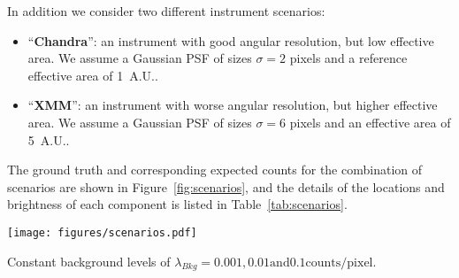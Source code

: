 \documentclass[twocolumn]{aastex631}
\newcommand{\chandra}{\textit{Chandra}~}
\newcommand{\xmm}{\textit{XMM}~}
\newcommand{\todo}[1]{\textcolor{red}{TODO: #1}\PackageWarning{TODO:}{#1!}}
\begin{document}
    In addition we consider two different instrument scenarios:

    \begin{itemize}
        \item {\enquote{\bf Chandra}:} an instrument with good angular resolution, but low effective area. We assume a Gaussian PSF of sizes $\sigma = 2$ pixels and a reference effective area of \qty[mode=text]{1}{A.U.}.
        \item {\enquote{\bf XMM}:} an instrument with worse angular resolution, but higher effective area. We assume a Gaussian PSF of sizes $\sigma = 6$ pixels and an effective area of \qty[mode=text]{5}{A.U.}.
    \end{itemize}
    
    The ground truth and corresponding expected counts for the combination of scenarios are shown in Figure~\ref{fig:scenarios}, and the details of the locations and brightness of each component is listed in Table~\ref{tab:scenarios}.

    \begin{figure*}
        \centering\texttt{[image: figures/scenarios.pdf]}
        \caption{Illustration of the expected counts for the different source and instrument scenarios we used to make test datasets. The source patterns shown are for the {\sl (A)}  {\tt points}, {\sl (B) {\tt asterism}}, {\sl (C)} {\tt shield}, and {\sl (D)} {\tt spiral} cases (see Section~\ref{sec:testmodels}). For the instrument scenario \chandra we convolved the with a narrow Gausssian shaped PSF of width $\sigma=2$~pix. For the scenario \xmm we used a Gaussian shaped PSF with a width of $\sigma=2$~pix and a five times increased effective are.
        All images are of size $128{\times}128$.  The dashed red and magenta boxes depict $32{\times}32$ and $64{\times}64$ regions of interest.  Note that the boxes are displaced to the lower left corner in Case B, and leftwards in Case D.
        convolved with a diffuse PSF (Gaussian with $\sigma=6$~pix), \todo{add back boxes if we have time}.
        }
        \label{fig:scenarios}
    \end{figure*}
     
    Constant background levels of $\lambda_{Bkg}= 0.001, 0.01 \textrm{and} 0.1 \textrm{counts/pixel}$. 
    
\end{document}

